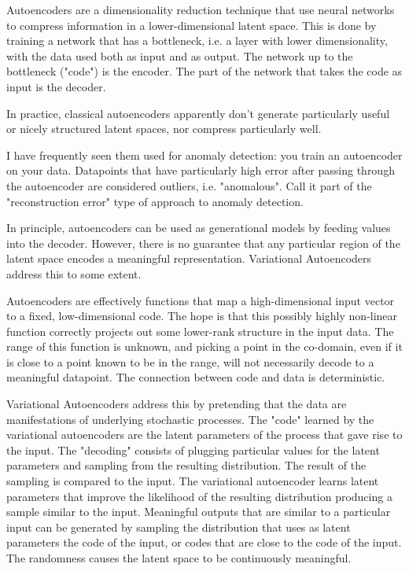 \label{Autoencoders}

Autoencoders are a dimensionality reduction technique that use neural networks to compress information in a lower-dimensional latent space. This is done by training a network that has a bottleneck, i.e. a layer with lower dimensionality, with the data used both as input and as output. The network up to the bottleneck ("code") is the encoder. The part of the network that takes the code as input is the decoder. 

In practice, classical autoencoders apparently don't generate particularly useful or nicely structured latent spaces, nor compress particularly well. 

I have frequently seen them used for anomaly detection: you train an autoencoder on your data. Datapoints that have particularly high error after passing through the autoencoder are considered outliers, i.e.  "anomalous". Call it part of the "reconstruction error" type of approach to anomaly detection.

In principle, autoencoders can be used as generational models by feeding values into the decoder. However, there is no guarantee that any particular region of the latent space encodes a meaningful representation. Variational Autoencoders address this to some extent.


\label{Variational Autoencoders}

Autoencoders are effectively functions that map a high-dimensional input vector to a fixed, low-dimensional code. The hope is that this possibly highly non-linear function correctly projects out some lower-rank structure in the input data. The range of this function is unknown, and picking a point in the co-domain, even if it is close to a point known to be in the range, will not necessarily decode to a meaningful datapoint. The connection between code and data is deterministic.

Variational Autoencoders address this by pretending that the data are manifestations of underlying stochastic processes. The "code" learned by the variational autoencoders are the latent parameters of the process that gave rise to the input. The "decoding" consists of plugging particular values for the latent parameters and sampling from the resulting distribution. The result of the sampling is compared to the input. The variational autoencoder learns latent parameters that improve the likelihood of the resulting distribution producing a sample similar to the input. Meaningful outputs that are similar to a particular input can be generated by sampling the distribution that uses as latent parameters the code of the input, or codes that are close to the code of the input. The randomness causes the latent space to be continuously meaningful. 

